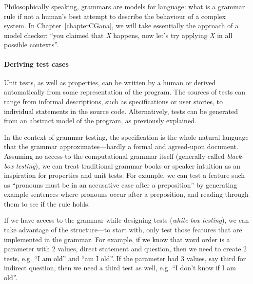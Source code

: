 Philosophically speaking, grammars are models for language: what is a grammar rule
if not a human's best attempt to describe the behaviour of a complex system.
In Chapter~\ref{chapterCGana}, we will take essentially the approach of a model
checker: ``you claimed that \emph{X} happens, now let's try applying \emph{X}
in all possible contexts''.

\paragraph{Deriving test cases}

Unit tests, as well as properties, can be written by a human or
derived automatically from some representation of the program. The
sources of tests can range from informal descriptions, such as
specifications or user stories, to individual statements in the source
code. Alternatively, tests can be generated from an abstract model of
the program, as previously explained.

In the context of grammar testing, the specification is the whole
natural language that the grammar approximates---hardly a formal and
agreed-upon document. Assuming no access to the computational grammar
itself (generally called \emph{black-box testing}), we can treat traditional
grammar books or speaker intuition as an inspiration for properties
and unit tests. For example, we can test a feature such as ``pronouns
must be in an accusative case after a preposition'' by generating
example sentences where pronouns occur after a preposition, and
reading through them to see if the rule holds.

If we have access to the grammar while designing tests
(\emph{white-box testing}), we can take advantage of the
structure---to start with, only test those features that are
implemented in the grammar. For example, if we know that word order is
a parameter with 2 values, direct statement and question,
then we need to create 2 tests, e.g. ``I am old'' and ``am I
old''. If the parameter had 3 values, say third for indirect question,
then we need a third test as well, e.g. ``I don't know if I am old''.



